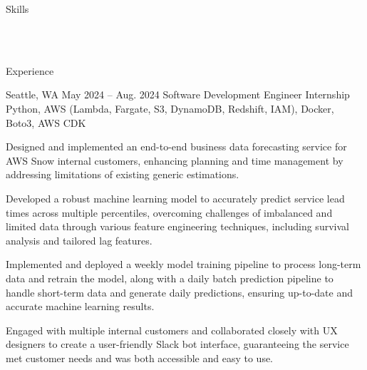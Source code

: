 \documentclass[10pt]{article}
\begin{document}
\pagestyle{empty}


\begin{customsectionnoskip}{Skills}

     \\ 
     \\ 

\end{customsectionnoskip}

\begin{customsection}{Experience}

     {Seattle, WA} {May 2024 -- Aug. 2024}
    {Software Development Engineer Internship}
    {Python, AWS (Lambda, Fargate, S3, DynamoDB, Redshift, IAM), Docker, Boto3, AWS CDK}
    {
        \item Designed and implemented an end-to-end business data forecasting service for AWS Snow internal customers, enhancing planning and time management by addressing limitations of existing generic estimations.
        \item Developed a robust machine learning model to accurately predict service lead times across multiple percentiles, overcoming challenges of imbalanced and limited data through various feature engineering techniques, including survival analysis and tailored lag features. 
        \item Implemented and deployed a weekly model training pipeline to process long-term data and retrain the model, along with a daily batch prediction pipeline to handle short-term data and generate daily predictions, ensuring up-to-date and accurate machine learning results. 
        \item Engaged with multiple internal customers and collaborated closely with UX designers to create a user-friendly Slack bot interface, guaranteeing the service met customer needs and was both accessible and easy to use.
    }
    
\end{customsection}
\end{document}
